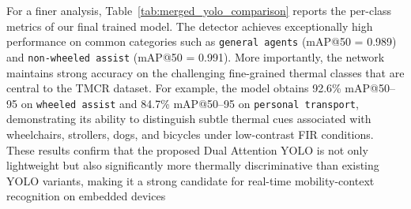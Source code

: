 \documentclass[journal,twoside,web]{ieeecolor}
\begin{document}
For a finer analysis, Table~\ref{tab:merged_yolo_comparison} reports the per-class metrics of our final trained model. The detector achieves exceptionally high performance on common categories such as \texttt{general agents} (mAP@50 = 0.989) and \texttt{non-wheeled assist} (mAP@50 = 0.991). More importantly, the network maintains strong accuracy on the challenging fine-grained thermal classes that are central to the TMCR dataset. For example, the model obtains 92.6\% mAP@50--95 on \texttt{wheeled assist} and 84.7\% mAP@50--95 on \texttt{personal transport}, demonstrating its ability to distinguish subtle thermal cues associated with wheelchairs, strollers, dogs, and bicycles under low-contrast FIR conditions. These results confirm that the proposed Dual Attention YOLO is not only lightweight but also significantly more thermally discriminative than existing YOLO variants, making it a strong candidate for real-time mobility-context recognition on embedded devices
\begin{table}[t]
\caption{{Cross-dataset performance of the proposed model on established thermal and related perception benchmarks.}}
\label{tab:dataset_results}
\centering
{}
\end{table}
\end{document}
